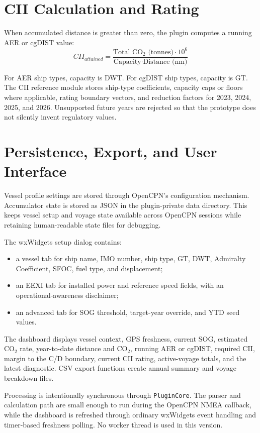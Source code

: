 \section{CII Calculation and Rating}
When accumulated distance is greater than zero, the plugin computes a running AER or cgDIST value:
\begin{equation}
    CII_{attained} = \frac{\text{Total CO}_2 \text{ (tonnes)} \cdot 10^6}{\text{Capacity} \cdot \text{Distance (nm)}}
    \label{eq:meth-running-cii}
\end{equation}

For AER ship types, capacity is DWT. For cgDIST ship types, capacity is GT. The CII reference module stores ship-type coefficients, capacity caps or floors where applicable, rating boundary vectors, and reduction factors for 2023, 2024, 2025, and 2026. Unsupported future years are rejected so that the prototype does not silently invent regulatory values.

\section{Persistence, Export, and User Interface}
Vessel profile settings are stored through OpenCPN's configuration mechanism. Accumulator state is stored as JSON in the plugin-private data directory. This keeps vessel setup and voyage state available across OpenCPN sessions while retaining human-readable state files for debugging.

The wxWidgets setup dialog contains:
\begin{itemize}
    \item a vessel tab for ship name, IMO number, ship type, GT, DWT, Admiralty Coefficient, SFOC, fuel type, and displacement;
    \item an EEXI tab for installed power and reference speed fields, with an operational-awareness disclaimer;
    \item an advanced tab for SOG threshold, target-year override, and YTD seed values.
\end{itemize}

The dashboard displays vessel context, GPS freshness, current SOG, estimated CO$_2$ rate, year-to-date distance and CO$_2$, running AER or cgDIST, required CII, margin to the C/D boundary, current CII rating, active-voyage totals, and the latest diagnostic. CSV export functions create annual summary and voyage breakdown files.

Processing is intentionally synchronous through \texttt{PluginCore}. The parser and calculation path are small enough to run during the OpenCPN NMEA callback, while the dashboard is refreshed through ordinary wxWidgets event handling and timer-based freshness polling. No worker thread is used in this version.

